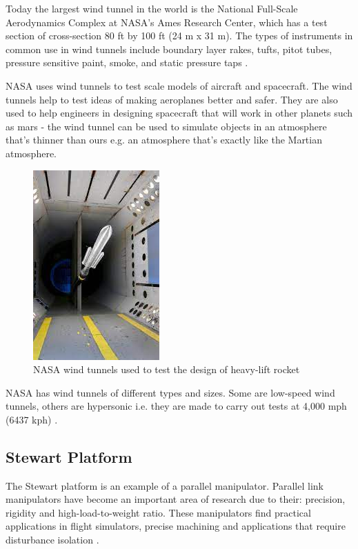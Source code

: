 Today the largest wind tunnel in the world is the National Full-Scale Aerodynamics Complex at NASA's Ames Research Center, which has a test section of cross-section 80 ft by 100 ft (24 m x 31 m). The types of instruments in common use in wind tunnels include boundary layer rakes, tufts, pitot tubes, pressure sensitive paint, smoke, and static pressure taps \cite{morris_force_2010}.

NASA uses wind tunnels to test scale models of aircraft and spacecraft. The wind tunnels help to test ideas of making aeroplanes better and safer. They are also used to help engineers in designing spacecraft that will work in other planets such as mars - the wind tunnel can be used to simulate objects in an atmosphere that's thinner than ours e.g. an atmosphere that's exactly like the Martian atmosphere.
\begin{center}
	\begin{figure}[H]
		\centering
		\includegraphics{Figures/Fig4}
		\caption[NASA Wind tunnel - space application]{NASA wind tunnels used to test the design of heavy-lift rocket \cite{NASA}}
	\end{figure}
\end{center}
NASA has wind tunnels of different types and sizes. Some are low-speed wind tunnels, others are hypersonic i.e. they are made to carry out tests at 4,000 mph (6437 kph) \cite{NASA}.
\subsection{Stewart Platform}
The Stewart platform is an example of a parallel manipulator.
Parallel link manipulators have become an important area of research due to their: precision, rigidity and high-load-to-weight ratio.
These manipulators find practical applications in flight simulators, precise machining and applications that require disturbance isolation \cite{iqbal_dynamic_2008}.

